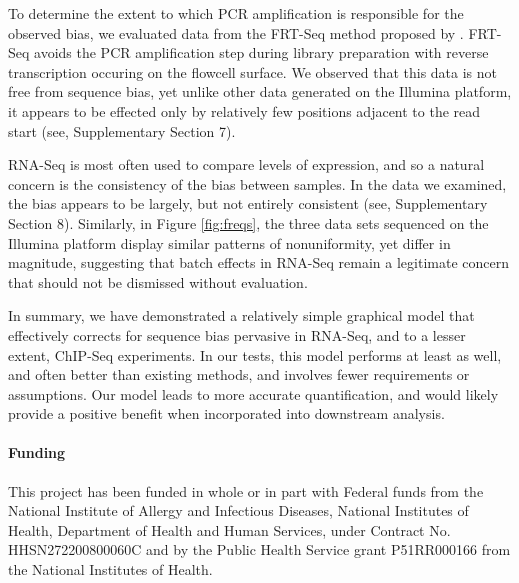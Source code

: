 \documentclass{bioinfo}
\begin{document}
To determine the extent to which PCR amplification is responsible for the
observed bias, we evaluated data from the FRT-Seq method proposed by
\citet{Mamanova2010}.  FRT-Seq avoids the PCR amplification step during library
preparation with reverse transcription occuring on the flowcell surface. We
observed that this data is not free from sequence bias, yet unlike other data
generated on the Illumina platform, it appears to be effected only by relatively
few positions adjacent to the read start (see, Supplementary Section 7).

RNA-Seq is most often used to compare levels of expression, and so a natural
concern is the consistency of the bias between samples. In the data we examined,
the bias appears to be largely, but not entirely consistent (see, Supplementary
Section 8).  Similarly, in Figure \ref{fig:freqs}, the three data sets sequenced
on the Illumina platform display similar patterns of nonuniformity, yet differ
in magnitude, suggesting that batch effects in RNA-Seq remain a legitimate
concern that should not be dismissed without evaluation.

In summary, we have demonstrated a relatively simple graphical model that
effectively corrects for sequence bias pervasive in RNA-Seq, and to a lesser
extent, ChIP-Seq experiments. In our tests, this model performs at least as
well, and often better than existing methods, and involves fewer requirements or
assumptions. Our model leads to more accurate quantification, and would likely
provide a positive benefit when incorporated into downstream analysis.


\paragraph{Funding\textcolon} This project has been funded in whole or in part
with Federal funds from the National Institute of Allergy and Infectious
Diseases, National Institutes of Health, Department of Health and Human Services,
under Contract No.  HHSN272200800060C and by the Public Health Service grant
P51RR000166 from the National Institutes of Health.





\end{document}
